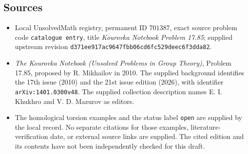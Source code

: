 \documentclass[11pt]{article}
\begin{document}
\subsection{Sources}
\begin{itemize}
\item Local UnsolvedMath registry, permanent ID \(701387\), exact source problem code \texttt{catalogue entry}, title \emph{Kourovka Notebook Problem 17.85}; supplied upstream revision \texttt{d371ee917ac9647fbb06cd6fc529deec6f3dda82}.
\item \emph{The Kourovka Notebook (Unsolved Problems in Group Theory)}, Problem 17.85, proposed by R. Mikhailov in 2010. The supplied background identifies the 17th issue (2010) and the 21st issue edition (2026), with identifier \texttt{arXiv:1401.0300v48}. The supplied collection description names E. I. Khukhro and V. D. Mazurov as editors.
\item The homological torsion examples and the status label \texttt{open} are supplied by the local record. No separate citations for those examples, literature-verification date, or external source links are supplied. The cited edition and its contents have not been independently checked for this draft.
\end{itemize}
\end{document}
